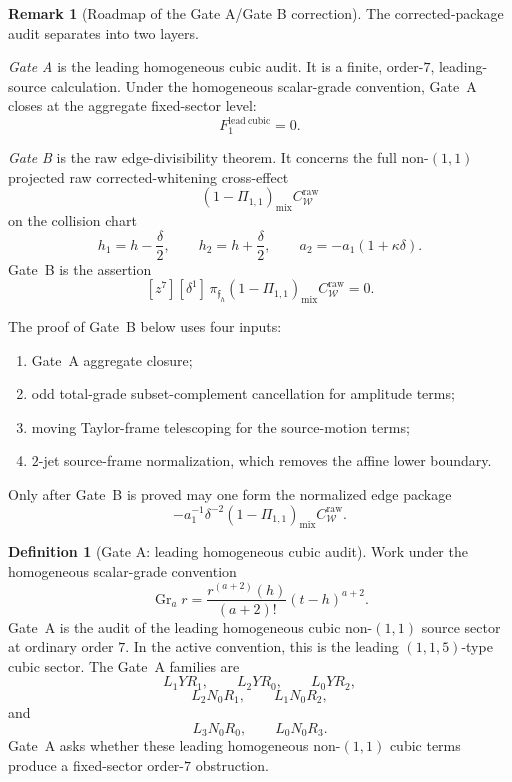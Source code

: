 \documentclass[11pt,a4paper]{amsart}
\theoremstyle{plain}
\theoremstyle{definition}
\newtheorem{definition}[theorem]{Definition}
\newtheorem{remark}[theorem]{Remark}
\begin{document}
\begin{remark}[Roadmap of the Gate A/Gate B correction]
\label{rem:roadmap-gate-a-gate-b-correction}
The corrected-package audit separates into two layers.

\emph{Gate A} is the leading homogeneous cubic audit.  It is a finite,
order-\(7\), leading-source calculation.  Under the homogeneous scalar-grade
convention, Gate~A closes at the aggregate fixed-sector level:
\[
F_1^{\mathrm{lead\ cubic}}=0.
\]

\emph{Gate B} is the raw edge-divisibility theorem.  It concerns the full
non-\((1,1)\) projected raw corrected-whitening cross-effect
\[
(1-\Pi_{1,1})_{\mathrm{mix}}C_{\mathcal W}^{\mathrm{raw}}
\]
on the collision chart
\[
h_1=h-\frac{\delta}{2},\qquad
h_2=h+\frac{\delta}{2},\qquad
a_2=-a_1(1+\kappa\delta).
\]
Gate~B is the assertion
\[
[z^7][\delta^1]\,
\pi_{\mathfrak f_h}(1-\Pi_{1,1})_{\mathrm{mix}}C_{\mathcal W}^{\mathrm{raw}}=0.
\]

The proof of Gate~B below uses four inputs:
\begin{enumerate}
\item Gate~A aggregate closure;
\item odd total-grade subset-complement cancellation for amplitude terms;
\item moving Taylor-frame telescoping for the source-motion terms;
\item \(2\)-jet source-frame normalization, which removes the affine lower
boundary.
\end{enumerate}
Only after Gate~B is proved may one form the normalized edge package
\[
-a_1^{-1}\delta^{-2}
(1-\Pi_{1,1})_{\mathrm{mix}}C_{\mathcal W}^{\mathrm{raw}}.
\]
\end{remark}

\begin{definition}[Gate A: leading homogeneous cubic audit]
\label{def:gate-a-leading-homogeneous-cubic-audit}
Work under the homogeneous scalar-grade convention
\[
\operatorname{Gr}_a r
=
\frac{r^{(a+2)}(h)}{(a+2)!}(t-h)^{a+2}.
\]
Gate~A is the audit of the leading homogeneous cubic non-\((1,1)\) source
sector at ordinary order \(7\).  In the active convention, this is the
leading \((1,1,5)\)-type cubic sector.  The Gate~A families are
\[
L_1YR_1,\qquad L_2YR_0,\qquad L_0YR_2,
\]
\[
L_2N_0R_1,\qquad L_1N_0R_2,
\]
and
\[
L_3N_0R_0,\qquad L_0N_0R_3.
\]
Gate~A asks whether these leading homogeneous non-\((1,1)\) cubic terms
produce a fixed-sector order-\(7\) obstruction.
\end{definition}
\end{document}
